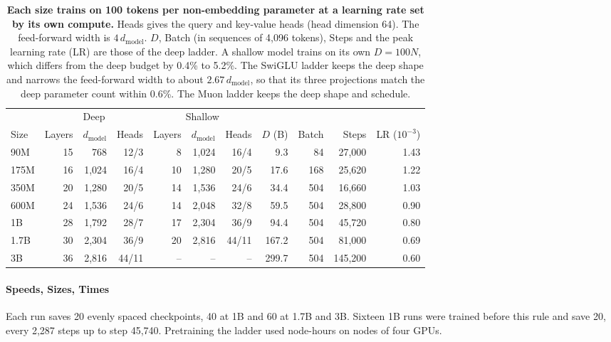 \begin{table}[t]
\centering
\small
\setlength{\tabcolsep}{4pt}
\begin{tabular*}{\textwidth}{@{\extracolsep{\fill}}lrrrrrrrrrr@{}}
\toprule
 & \multicolumn{3}{c}{Deep} & \multicolumn{3}{c}{Shallow} & & & & \\
\cmidrule(lr){2-4}\cmidrule(lr){5-7}
Size & Layers & $d_{\mathrm{model}}$ & Heads & Layers & $d_{\mathrm{model}}$ & Heads & $D$ (B) & Batch & Steps & LR ($10^{-3}$) \\
\midrule
90M & 15 & 768 & 12/3 & 8 & 1,024 & 16/4 & 9.3 & 84 & 27,000 & 1.43 \\
175M & 16 & 1,024 & 16/4 & 10 & 1,280 & 20/5 & 17.6 & 168 & 25,620 & 1.22 \\
350M & 20 & 1,280 & 20/5 & 14 & 1,536 & 24/6 & 34.4 & 504 & 16,660 & 1.03 \\
600M & 24 & 1,536 & 24/6 & 14 & 2,048 & 32/8 & 59.5 & 504 & 28,800 & 0.90 \\
1B & 28 & 1,792 & 28/7 & 17 & 2,304 & 36/9 & 94.4 & 504 & 45,720 & 0.80 \\
1.7B & 30 & 2,304 & 36/9 & 20 & 2,816 & 44/11 & 167.2 & 504 & 81,000 & 0.69 \\
3B & 36 & 2,816 & 44/11 & -- & -- & -- & 299.7 & 504 & 145,200 & 0.60 \\
\bottomrule
\end{tabular*}
\caption{\textbf{Each size trains on 100 tokens per non-embedding parameter at a learning rate set by its own compute.} Heads gives the query and key-value heads (head dimension 64). The feed-forward width is $4\,d_{\mathrm{model}}$. $D$, Batch (in sequences of 4,096 tokens), Steps and the peak learning rate (LR) are those of the deep ladder. A shallow model trains on its own $D = 100N$, which differs from the deep budget by 0.4\% to 5.2\%. The SwiGLU ladder keeps the deep shape and narrows the feed-forward width to about $2.67\,d_{\mathrm{model}}$, so that its three projections match the deep parameter count within 0.6\%. The Muon ladder keeps the deep shape and schedule.}
\label{tab:card-ladder}
\end{table}

\paragraph{Speeds, Sizes, Times}

Each run saves 20 evenly spaced checkpoints, 40 at 1B and 60 at 1.7B and 3B. Sixteen 1B runs were trained before this rule and save 20, every 2,287 steps up to step 45,740. Pretraining the ladder used \npretrainnodehours node-hours on nodes of four GPUs.

